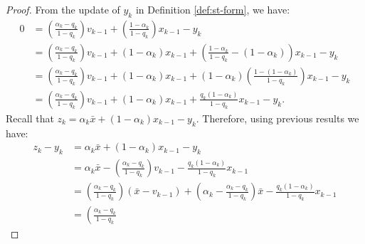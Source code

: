 \documentclass[12pt]{article}
\begin{document}
        \begin{proof}
            From the update of $y_k$ in Definition \ref{def:st-form}, we have: 
            \begin{align*}
                0 &= \left(
                \frac{\alpha_k - q_k}{1 - q_k} 
                \right)v_{k - 1} 
                + \left(
                    \frac{1 - \alpha_k}{1 - q_k}
                \right)x_{k - 1} - y_k
                \\
                &= 
                \left(
                    \frac{\alpha_k - q_k}{1 - q_k} 
                \right)v_{k - 1} 
                + (1 - \alpha_k)x_{k - 1}
                + \left(
                    \frac{1 - \alpha_k}{1 - q_k} - (1 - \alpha_k)
                \right)x_{k - 1} - y_k
                \\
                &= 
                \left(
                    \frac{\alpha_k - q_k}{1 - q_k} 
                \right)v_{k - 1} 
                + (1 - \alpha_k)x_{k - 1}
                + (1 - \alpha_k)\left(
                    \frac{1 - (1 - \alpha_k)}{1 - q_k}
                \right)x_{k - 1} - y_k
                \\
                &= 
                \left(
                    \frac{\alpha_k - q_k}{1 - q_k} 
                \right)v_{k - 1} 
                + (1 - \alpha_k)x_{k - 1}
                + \frac{q_k(1 -\alpha_k)}{1 - q_k}x_{k - 1} - y_k. 
            \end{align*}
            Recall that $z_k = \alpha_k \bar x + (1 - \alpha_k)x_{k - 1} - y_k$. 
            Therefore, using previous results we have:
            \begin{align*}
                z_k - y_k &= 
                \alpha_k \bar x + (1 - \alpha_k)x_{k - 1} - y_k
                \\
                &= \alpha_k \bar x 
                - \left(
                    \frac{\alpha_k - q_k}{1 - q_k}
                \right)v_{k - 1}
                - \frac{q_k(1 -\alpha_k)}{1 - q_k}x_{k - 1}
                \\
                &= 
                \left(
                    \frac{\alpha_k - q_k}{1 - q_k}
                \right)(\bar x - v_{k - 1})
                + \left(
                    \alpha_k - \frac{\alpha_k - q_k}{1 - q_k} 
                \right)\bar x
                - \frac{q_k(1 -\alpha_k)}{1 - q_k}x_{k - 1}
                \\
                &= 
                \left(
                    \frac{\alpha_k - q_k}{1 - q_k}

\end{align*}
\end{proof}
\end{document}
